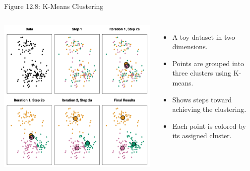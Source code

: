 \documentclass[aspectratio=169,xcolor=dvipsnames]{beamer}
\begin{document}
\begin{frame}{Figure 12.8: K-Means Clustering}
  \begin{columns}
    \includegraphics[width=\linewidth]{images/figure12_8.png} %

    \begin{itemize}
      \item A toy dataset in two dimensions.
      \item Points are grouped into three clusters using K-means.
      \item Shows steps toward achieving the clustering.
      \item Each point is colored by its assigned cluster.
    \end{itemize}

  \end{columns}
\end{frame}
\end{document}
